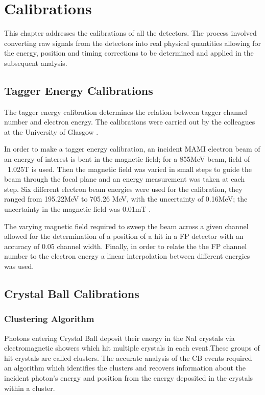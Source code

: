 \chapter{Calibrations}

\indent This chapter addresses the calibrations of all the detectors. The process involved converting raw signals from the detectors into real physical quantities allowing for the energy, position and timing corrections to be determined and applied in the subsequent analysis.

\section{Tagger Energy Calibrations}

\indent The tagger energy calibration determines the relation between tagger channel number and electron energy. The calibrations were carried out by the colleagues at the University of Glasgow \cite{mcgeorge}.

\indent In order to make a tagger energy calibration, an incident MAMI electron beam of an energy of interest is bent in the magnetic field; for a 855MeV beam, field of ~1.025T is used. Then the magnetic field was varied in small steps to guide the beam through the focal plane and an energy measurement was taken at each step. Six different electron beam energies were used for the calibration, they ranged from 195.22MeV to 705.26 MeV, with the uncertainty of 0.16MeV; the uncertainty in the magnetic field was 0.01mT \cite{duncan}.

\indent The varying magnetic field required to sweep the beam across a given channel allowed for the determination of a position of a  hit in a FP detector with an accuracy of 0.05 channel width. Finally, in order to relate the the FP channel number to the electron energy a linear interpolation between different energies was used.

\section{Crystal Ball Calibrations}

\subsection{Clustering Algorithm}

\indent Photons entering Crystal Ball deposit their energy in the NaI crystals via electromagnetic showers which hit multiple crystals in each event.These groups of hit crystals are called clusters. The accurate analysis of the CB events required an algorithm which identifies the clusters and recovers information about the incident photon's energy and position from the energy deposited in the crystals within a cluster.

